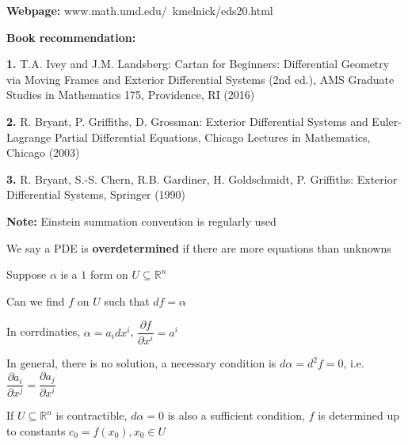 \documentclass[../main.tex]{subfiles}
\begin{document}
\textbf{Webpage:} www.math.umd.edu/~kmelnick/eds20.html \par
\textbf{Book recommendation:} \par
\textbf{1. }T.A. Ivey and J.M. Landsberg: Cartan for Beginners: Differential Geometry via Moving Frames and Exterior Differential Systems (2nd ed.), AMS Graduate Studies in Mathematics 175, Providence, RI (2016) \par
\textbf{2. }R. Bryant, P. Griffiths, D. Grossman: Exterior Differential Systems and Euler-Lagrange Partial Differential Equations, Chicago Lectures in Mathematics, Chicago (2003) \par
\textbf{3. }R. Bryant, S.-S. Chern, R.B. Gardiner, H. Goldschmidt, P. Griffiths: Exterior Differential Systems, Springer (1990) \par
\textbf{Note:} Einstein summation convention is regularly used

\begin{definition}
We say a PDE is \textbf{overdetermined} if there are more equations than unknowns
\end{definition}

\begin{example}
Suppose $\alpha$ is a $1$ form on $U\subseteq\mathbb R^n$ \par
Can we find $f$ on $U$ such that $df=\alpha$ \par
In corrdinaties, $\alpha=a_idx^i$, $\dfrac{\partial f}{\partial x^i}=a^i$ \par
In general, there is no solution, a necessary condition is $d\alpha=d^2f=0$, i.e. $\dfrac{\partial a_i}{\partial x^j}=\dfrac{\partial a_j}{\partial x^i}$
\end{example}

\begin{lemma}
If $U\subseteq\mathbb R^n$ is contractible, $d\alpha=0$ is also a sufficient condition, $f$ is determined up to constants $c_0=f(x_0),x_0\in U$
\end{lemma}
\end{document}
